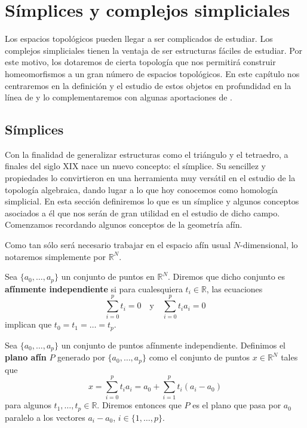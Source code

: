 
\chapter{Símplices y complejos simpliciales}

Los espacios topológicos pueden llegar a ser complicados de estudiar. Los
complejos simpliciales tienen la ventaja de ser estructuras fáciles de estudiar.
Por este motivo, los dotaremos de cierta topología que nos permitirá construir
homeomorfismos a un gran número de espacios topológicos. En este capítulo nos centraremos
en la definición y el estudio de estos objetos en profundidad en la línea de \cite{munkres2018elements}
y lo complementaremos con algunas aportaciones de \cite{lee2010introduction}.

\section{Símplices}
Con la finalidad de generalizar estructuras como el triángulo y el tetraedro, a
finales del siglo XIX nace un nuevo concepto: el símplice. Su sencillez y
propiedades lo convirtieron en una herramienta muy versátil en el estudio de la
topología algebraica, dando lugar a lo que hoy conocemos como homología simplicial.
En esta sección definiremos lo que es un símplice y algunos conceptos asociados
a él que nos serán de gran utilidad en el estudio de dicho campo. Comenzamos recordando
algunos conceptos de la geometría afín.

Como tan sólo será necesario trabajar en el espacio afín usual $N$-dimensional,
lo notaremos simplemente por $\mathbb{R}^{N}$.

\begin{definicion}
	Sea $\{a_{0}, \ldots, a_{p}\}$ un conjunto de puntos en $\mathbb{R}^{N}$.
	Diremos que dicho conjunto es \textbf{afínmente independiente} si para cualesquiera
	$t_{i}\in \mathbb{R}$, las ecuaciones
	\[
	\sum_{i=0}^{p}t_{i}=0 \quad \text{y}\quad \sum_{i=0}^{p}t_{i}a_{i}=0
	\]
	implican que $t_{0}= t_{1}= \ldots = t_{p}$.
\end{definicion}

\begin{definicion}
	Sea $\{a_{0}, \ldots, a_{p}\}$ un conjunto de puntos afínmente independiente.
	Definimos el \textbf{plano afín} $P$ generado por $\{a_{0}, \ldots, a_{p}\}$ como
	el conjunto de puntos $x \in \mathbb{R}^{N}$ tales que
	\[
	x = \sum_{i=0}^{p}t_{i}a_{i}= a_{0}+ \sum_{i=1}^{p}t_{i}(a_{i}- a_{0})
	\]
	para algunos $t_{1}, \ldots, t_{p}\in \mathbb{R}$. Diremos entonces que $P$ es
	el plano que pasa por $a_{0}$ paralelo a los vectores $a_{i}- a_{0}$, $i \in \{
	1, \ldots, p\}$.
\end{definicion}

